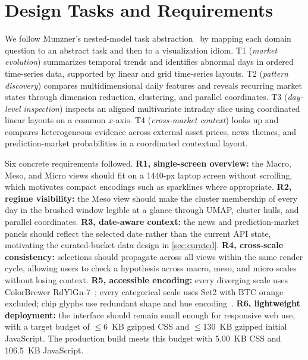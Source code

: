 \documentclass[journal,hideappendix]{vgtc}      %
\begin{document}
\section{Design Tasks and Requirements}
\label{sec:design}

We follow Munzner's nested-model task abstraction~\cite{munzner2014} by mapping each domain question to an abstract task and then to a visualization idiom.  
T1 (\emph{market evolution}) summarizes temporal trends and identifies abnormal days in ordered time-series data, supported by linear and grid time-series layouts. 
T2 (\emph{pattern discovery}) compares multidimensional daily features and reveals recurring market states through dimension reduction, clustering, and parallel coordinates.  
T3 (\emph{day-level inspection}) inspects an aligned multivariate intraday slice using coordinated linear layouts on a common \(x\)-axis.
T4 (\emph{cross-market context}) looks up and compares heterogeneous evidence across external asset prices, news themes, and prediction-market probabilities in a coordinated contextual layout.

Six concrete requirements followed.
\textbf{R1, single-screen overview:} the Macro, Meso, and Micro views should fit on a 1440-px laptop screen without scrolling, which motivates compact encodings such as sparklines where appropriate. 
\textbf{R2, regime visibility:} the Meso view should make the cluster membership of every day in the brushed window legible at a glance through UMAP, cluster hulls, and parallel coordinates. 
\textbf{R3, date-aware context:} the news and prediction-market panels should reflect the selected date rather than the current API state, motivating the curated-bucket data design in \cref{sec:curated}. 
\textbf{R4, cross-scale consistency:} selections should propagate across all views within the same render cycle, allowing users to check a hypothesis across macro, meso, and micro scales without losing context. 
\textbf{R5, accessible encoding:} every diverging scale uses ColorBrewer RdYlGn-7~\cite{colorbrewer}; every categorical scale uses Set2 with BTC orange excluded; chip glyphs use redundant shape and hue encoding~\cite{wong2011points}.
\textbf{R6, lightweight deployment:} the interface should remain small enough for responsive web use, with a target budget of \(\le 6\)~KB gzipped CSS and \(\le 130\)~KB gzipped initial JavaScript. 
The production build meets this budget with 5.00~KB CSS and 106.5~KB JavaScript.
\end{document}
